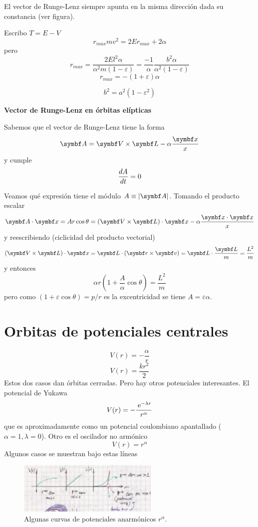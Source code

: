 \documentclass[10pt,oneside]{CBFT_book}
\begin{document}
El vector de Runge-Lenz siempre apunta en la misma dirección dada su constancia (ver figura).

Escribo $ T = E - V $
\[
	r_{max} m v^2 = 2Er_{max} + 2\alpha
\]
pero 
\[
	r_{max} = \frac{2 E l^2 \alpha}{\alpha^2 m (1-\varepsilon)} = \frac{-1}{\alpha}\frac{b^2 \alpha}{\alpha^2(1-\varepsilon)}
\]
\[
	r_{max} = - (1+\varepsilon) \alpha
\]

\[
	b^2 = a^2( 1 - \varepsilon^2 )
\]

\begin{ejemplo}{\bfseries Vector de Runge-Lenz en órbitas elípticas}

Sabemos que el vector de Runge-Lenz tiene la forma 
\[
	\vb{A} = \pv{V}{L} - \alpha \frac{\vb{x}}{x}
\]
y cumple 
\[
	\frac{d^{\hspace{-0.05em}} {A}}{d {t}^{\hspace{-0.05em}}} = 0
\]

Veamos qué expresión tiene el módulo $ A \equiv |\vb{A}| $. Tomando el producto escalar 
\[
	\pe{A}{x} = A r \cos \theta = ( \pv{V}{L} )\cdot \vb{x} - \alpha \frac{\pe{x}{x}}{x}
\]
y reescribiendo (ciclicidad del producto vectorial)
\[
	( \pv{V}{L} )\cdot \vb{x} = \vb{L} \cdot ( \pv{r}{v} ) = \vb{L} \cdot \frac{ \vb{L} }{m} = \frac{L^2}{m}
\]
y entonces
\[
	\alpha r \left( 1 + \frac{A}{\alpha} \cos \theta \right) = \frac{L^2}{m}
\]
pero como $ (1 + \varepsilon \cos \theta ) = p / r $ es la excentricidad se tiene $ A = \varepsilon \alpha $.

\end{ejemplo}

\section{Orbitas de potenciales centrales}

\[
	V(r) = -\frac{\alpha}{r}
\]
\[
	V(r) = \frac{ k r^2 }{2}
\]
Estos dos casos dan órbitas cerradas. Pero hay otros potenciales interesantes.
El potencial de Yukawa
\[
	V(r) = - \frac{\:\mathrm{e}^{-\lambda r}}{r^\alpha}
\]
que es aproximadamente como un potencial coulombiano apantallado ($\alpha=1,\lambda=0$).
Otro es el oscilador no armónico
\[
	V(r) = r^\alpha
\]
Algunos casos se muestran bajo estas líneas

\begin{figure}[hbt]
	\begin{center}
	\includegraphics[width=0.6\textwidth]{images/fig_mc_potenciales_otro.pdf}
	\end{center}
	\caption{Algunas curvas de potenciales anarmónicos $ r^\alpha $.}
\end{figure}
\end{document}
